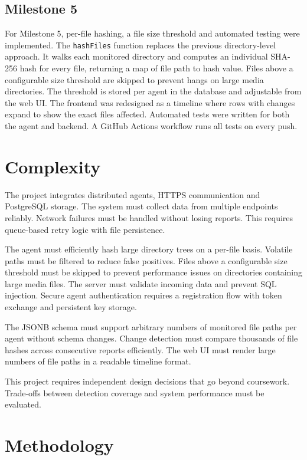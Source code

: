 \documentclass[conference]{IEEEtran}
\begin{document}
\subsection{Milestone 5}

For Milestone 5, per-file hashing, a file size threshold and automated testing were implemented. The \texttt{hashFiles} function replaces the previous directory-level approach. It walks each monitored directory and computes an individual SHA-256 hash for every file, returning a map of file path to hash value. Files above a configurable size threshold are skipped to prevent hangs on large media directories. The threshold is stored per agent in the database and adjustable from the web UI. The frontend was redesigned as a timeline where rows with changes expand to show the exact files affected. Automated tests were written for both the agent and backend. A GitHub Actions workflow runs all tests on every push.

\section{Complexity}

The project integrates distributed agents, HTTPS communication and PostgreSQL storage. The system must collect data from multiple endpoints reliably. Network failures must be handled without losing reports. This requires queue-based retry logic with file persistence.

The agent must efficiently hash large directory trees on a per-file basis. Volatile paths must be filtered to reduce false positives. Files above a configurable size threshold must be skipped to prevent performance issues on directories containing large media files. The server must validate incoming data and prevent SQL injection. Secure agent authentication requires a registration flow with token exchange and persistent key storage.

The JSONB schema must support arbitrary numbers of monitored file paths per agent without schema changes. Change detection must compare thousands of file hashes across consecutive reports efficiently. The web UI must render large numbers of file paths in a readable timeline format.

This project requires independent design decisions that go beyond coursework. Trade-offs between detection coverage and system performance must be evaluated.

\section{Methodology}
\end{document}
